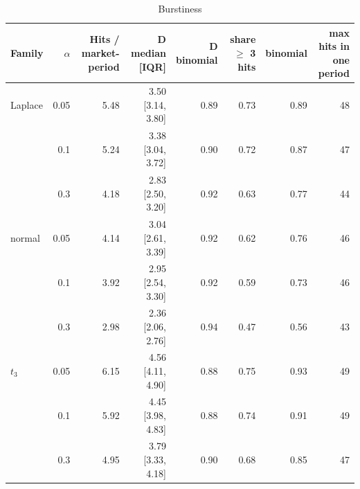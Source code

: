 \begin{table}
\centering
\caption{Burstiness}
\label{tab:a15_burstiness}
\small
\begin{tabular}{lrrrrrrr}
\toprule
Family & $\alpha$ & \makecell[b]{Hits /\\{}market-period} & \makecell[b]{D median\\{}[IQR]} & \makecell[b]{D\\{}binomial} & \makecell[b]{share\\{}$\geq$ 3 hits} & binomial & \makecell[b]{max hits in\\{}one period} \\
\midrule
Laplace & 0.05 & 5.48 & 3.50 [3.14, 3.80] & 0.89 & 0.73 & 0.89 & 48 \\
 & 0.1 & 5.24 & 3.38 [3.04, 3.72] & 0.90 & 0.72 & 0.87 & 47 \\
 & 0.3 & 4.18 & 2.83 [2.50, 3.20] & 0.92 & 0.63 & 0.77 & 44 \\
normal & 0.05 & 4.14 & 3.04 [2.61, 3.39] & 0.92 & 0.62 & 0.76 & 46 \\
 & 0.1 & 3.92 & 2.95 [2.54, 3.30] & 0.92 & 0.59 & 0.73 & 46 \\
 & 0.3 & 2.98 & 2.36 [2.06, 2.76] & 0.94 & 0.47 & 0.56 & 43 \\
$t_3$ & 0.05 & 6.15 & 4.56 [4.11, 4.90] & 0.88 & 0.75 & 0.93 & 49 \\
 & 0.1 & 5.92 & 4.45 [3.98, 4.83] & 0.88 & 0.74 & 0.91 & 49 \\
 & 0.3 & 4.95 & 3.79 [3.33, 4.18] & 0.90 & 0.68 & 0.85 & 47 \\
\bottomrule
\end{tabular}
\end{table}
